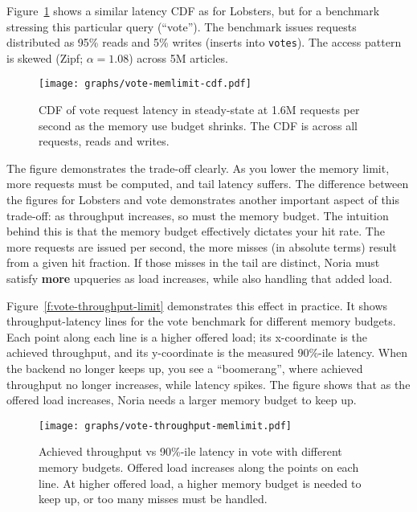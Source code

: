 Figure~\ref{f:vote-mem-latency} shows a similar latency CDF as for Lobsters, but
for a benchmark stressing this particular query (``vote''). The benchmark issues
requests distributed as 95\% reads and 5\% writes (inserts into \texttt{votes}).
The access pattern is skewed (Zipf; $\alpha = 1.08$) across 5M articles.

\begin{figure}[h]
  \centering
  \texttt{[image: graphs/vote-memlimit-cdf.pdf]}
  \caption{CDF of vote request latency in steady-state at 1.6M requests per
  second as the memory use budget shrinks. The CDF is across all requests, reads
  and writes.}
  \label{f:vote-mem-latency}
\end{figure}

The figure demonstrates the trade-off clearly. As you lower the memory limit,
more requests must be computed, and tail latency suffers. The difference between
the figures for Lobsters and vote demonstrates another important aspect of this
trade-off: as throughput increases, so must the memory budget. The intuition
behind this is that the memory budget effectively dictates your hit rate. The
more requests are issued per second, the more misses (in absolute terms) result
from a given hit fraction. If those misses in the tail are distinct, Noria must
satisfy \textbf{more} upqueries as load increases, while also handling that
added load.

Figure~\ref{f:vote-throughput-limit} demonstrates this effect in practice. It
shows throughput-latency lines for the vote benchmark for different memory
budgets. Each point along each line is a higher offered load; its x-coordinate
is the achieved throughput, and its y-coordinate is the measured 90\%-ile
latency. When the backend no longer keeps up, you see a ``boomerang'', where
achieved throughput no longer increases, while latency spikes. The figure
shows that as the offered load increases, Noria needs a larger memory budget to
keep up.

\begin{figure}[h]
  \centering
  \texttt{[image: graphs/vote-throughput-memlimit.pdf]}
  \caption{Achieved throughput vs 90\%-ile latency in vote with different memory
  budgets. Offered load increases along the points on each line. At higher
  offered load, a higher memory budget is needed to keep up, or too many misses
  must be handled.}
  \label{f:vote-throughput-memlimit}
\end{figure}

\begin{comment}
\begin{inprogress}
Figure~\ref{f:lobsters-throughput-latency-steady-full-partial} shows that
partial has a higher tail latency because some miss. Same median (?).
\end{inprogress}

\begin{figure}[h]
  \centering
  \texttt{[image: graphs/lobsters-partial-overhead.pdf]}
  \caption{Lobsters throughput-latency in steady-state at some memlimit full vs partial.}
  \label{f:lobsters-throughput-latency-steady-full-partial}
\end{figure}
\end{comment}

